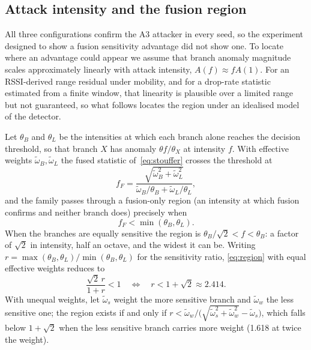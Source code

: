 \subsection{Attack intensity and the fusion region}
\label{sec:region}

All three configurations confirm the A3 attacker in every seed, so the
experiment designed to show a fusion sensitivity advantage did not show one.
To locate where an advantage could appear we assume that branch anomaly
magnitude scales approximately linearly with attack intensity,
$A(f) \approx f A(1)$. For an RSSI-derived range residual under mobility, and
for a drop-rate statistic estimated from a finite window, that linearity is
plausible over a limited range but not guaranteed, so what follows locates the
region under an idealised model of the detector.

Let $\theta_B$ and $\theta_L$ be the intensities at which each branch alone
reaches the decision threshold, so that branch $X$ has anomaly
$\theta f/\theta_X$ at intensity $f$. With effective weights
$\tilde\omega_B, \tilde\omega_L$ the fused statistic of~\eqref{eq:stouffer}
crosses the threshold at
\begin{equation}
\label{eq:ffused}
f_F = \frac{\sqrt{\tilde\omega_B^{2} + \tilde\omega_L^{2}}}
           {\tilde\omega_B/\theta_B + \tilde\omega_L/\theta_L},
\end{equation}
and the family passes through a fusion-only region (an intensity at which
fusion confirms and neither branch does) precisely when
\begin{equation}
\label{eq:region}
f_F < \min(\theta_B, \theta_L).
\end{equation}
When the branches are equally sensitive the region is
$\theta_B/\sqrt2 < f < \theta_B$: a factor of $\sqrt2$ in intensity, half an
octave, and the widest it can be. Writing
$r = \max(\theta_B,\theta_L)/\min(\theta_B,\theta_L)$ for the sensitivity
ratio, \eqref{eq:region} with equal effective weights reduces to
\begin{equation}
\label{eq:ratio}
\frac{\sqrt{2}\,r}{1+r} < 1
\quad\Longleftrightarrow\quad
r < 1 + \sqrt{2} \approx 2.414 .
\end{equation}
With unequal weights, let $\tilde\omega_s$ weight the more sensitive branch and
$\tilde\omega_w$ the less sensitive one; the region exists if and only if
$r < \tilde\omega_w / \bigl(\sqrt{\tilde\omega_s^2 + \tilde\omega_w^2} -
\tilde\omega_s\bigr)$, which falls below $1+\sqrt{2}$ when the less sensitive
branch carries more weight (1.618 at twice the weight).

